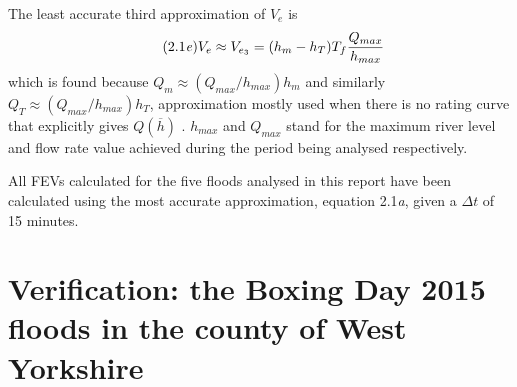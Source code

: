 \documentclass[11pt,a4paper]{article}
\begin{document}
The least accurate third approximation of $V_e$ is
\begin{equation}\tag{2.1\textit{e}}
V_e\approx V_{e_3}=(h_m-h_T)T_f\frac{Q_{max}}{h_{max}}
\end{equation}
which is found because $Q_m\approx (Q_{max}/h_{max})h_m$ and similarly $Q_T\approx (Q_{max}/h_{max})h_T$, approximation mostly used when there is no rating curve that explicitly gives $Q(\overline{h})$ \cite{Calder-Don}. $h_{max}$ and $Q_{max}$ stand for the maximum river level and flow rate value achieved during the period being analysed respectively. 

All FEVs calculated for the five floods analysed in this report have been calculated using the most accurate approximation, equation 2.1\textit{a}, given a $\Delta t$ of 15 minutes.

\section{Verification: the Boxing Day 2015 floods in the county of West Yorkshire}
\end{document}
